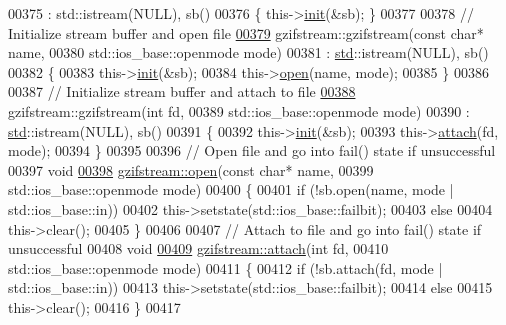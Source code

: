 \begin{DoxyCode}
{00375 : std::istream(NULL), sb()
00376 \{ this->\hyperlink{structinit}{init}(&sb); \}
00377 
00378 \textcolor{comment}{// Initialize stream buffer and open file}
\hyperlink{classgzifstream_a90f6e0eea83b7ce3c64f755b51b5b011}{00379} gzifstream::gzifstream(\textcolor{keyword}{const} \textcolor{keywordtype}{char}* name,
00380                        std::ios\_base::openmode mode)
00381 : \hyperlink{namespacestd}{std}::istream(NULL), sb()
00382 \{
00383   this->\hyperlink{structinit}{init}(&sb);
00384   this->\hyperlink{classgzifstream_a8105f9300d36dafbe8b10c204583f5a1}{open}(name, mode);
00385 \}
00386 
00387 \textcolor{comment}{// Initialize stream buffer and attach to file}
\hyperlink{classgzifstream_aa5ab9dcc3ab35bffe781f4c49239826e}{00388} gzifstream::gzifstream(\textcolor{keywordtype}{int} fd,
00389                        std::ios\_base::openmode mode)
00390 : \hyperlink{namespacestd}{std}::istream(NULL), sb()
00391 \{
00392   this->\hyperlink{structinit}{init}(&sb);
00393   this->\hyperlink{classgzifstream_a24aff901c395acbdaddb7878f4ddb7aa}{attach}(fd, mode);
00394 \}
00395 
00396 \textcolor{comment}{// Open file and go into fail() state if unsuccessful}
00397 \textcolor{keywordtype}{void}
\hyperlink{classgzifstream_a8105f9300d36dafbe8b10c204583f5a1}{00398} \hyperlink{classgzifstream_a8105f9300d36dafbe8b10c204583f5a1}{gzifstream::open}(\textcolor{keyword}{const} \textcolor{keywordtype}{char}* name,
00399                  std::ios\_base::openmode mode)
00400 \{
00401   \textcolor{keywordflow}{if} (!sb.open(name, mode | std::ios\_base::in))
00402     this->setstate(std::ios\_base::failbit);
00403   \textcolor{keywordflow}{else}
00404     this->clear();
00405 \}
00406 
00407 \textcolor{comment}{// Attach to file and go into fail() state if unsuccessful}
00408 \textcolor{keywordtype}{void}
\hyperlink{classgzifstream_a24aff901c395acbdaddb7878f4ddb7aa}{00409} \hyperlink{classgzifstream_a24aff901c395acbdaddb7878f4ddb7aa}{gzifstream::attach}(\textcolor{keywordtype}{int} fd,
00410                    std::ios\_base::openmode mode)
00411 \{
00412   \textcolor{keywordflow}{if} (!sb.attach(fd, mode | std::ios\_base::in))
00413     this->setstate(std::ios\_base::failbit);
00414   \textcolor{keywordflow}{else}
00415     this->clear();
00416 \}
00417 
}
\end{DoxyCode}
